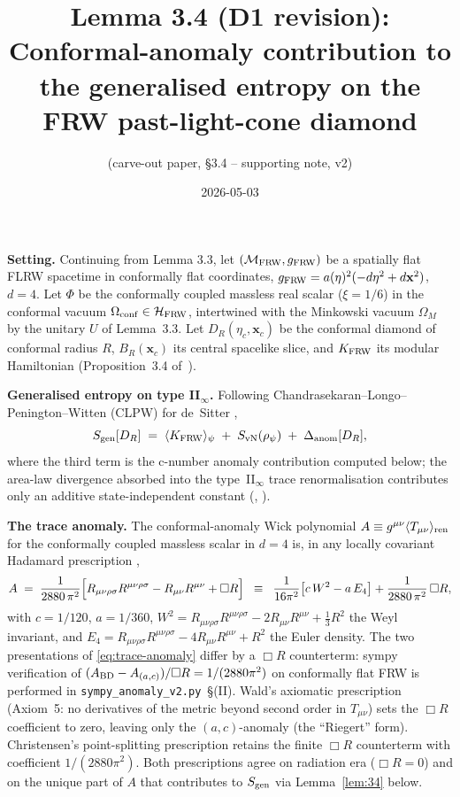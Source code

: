 \documentclass[11pt]{article}
\title{Lemma 3.4 (D1 revision):\\
       Conformal-anomaly contribution to the generalised entropy
       on the FRW past-light-cone diamond}
\author{(carve-out paper, \S 3.4 -- supporting note, v2)}
\date{2026-05-03}
\begin{document}
\maketitle

\noindent\textbf{Setting.}  Continuing from Lemma 3.3, let
$(\mathcal{M}_{\rm FRW},g_{\rm FRW})$ be a spatially flat FLRW spacetime
in conformally flat coordinates,
$g_{\rm FRW}=a(\eta)^2(-d\eta^2+d\mathbf{x}^2)$, $d=4$.  Let $\Phi$ be
the conformally coupled massless real scalar ($\xi=1/6$) in the
conformal vacuum $\Omega_{\rm conf}\in\mathcal{H}_{\rm FRW}$,
intertwined with the Minkowski vacuum $\Omega_M$ by the unitary $U$ of
Lemma~3.3.  Let $D_R(\eta_c,\mathbf{x}_c)$ be the conformal diamond of
conformal radius $R$, $B_R(\mathbf{x}_c)$ its central spacelike slice,
and $K_{\rm FRW}$ its modular Hamiltonian (Proposition~3.4
of~\cite{Lemma33}).

\medskip
\noindent\textbf{Generalised entropy on type II$_\infty$.}  Following
Chandrasekaran--Longo--Penington--Witten (CLPW) for de~Sitter
\cite{CLPW2022,Witten2021},
\begin{equation}
   S_{\rm gen}[D_R]
   \;=\;
   \langle K_{\rm FRW}\rangle_\psi \;+\; S_{\rm vN}(\rho_\psi)
   \;+\; \Delta_{\rm anom}[D_R],
   \label{eq:Sgen}
\end{equation}
where the third term is the c-number anomaly contribution computed
below; the area-law divergence absorbed into the type~II$_\infty$ trace
renormalisation contributes only an additive state-independent constant
(\cite[\S5.4]{CLPW2022}, \cite[\S2]{Witten2021}).

\medskip
\noindent\textbf{The trace anomaly.}  The conformal-anomaly Wick
polynomial $A\equiv g^{\mu\nu}\langle T_{\mu\nu}\rangle_{\rm ren}$ for
the conformally coupled massless scalar in $d=4$ is, in any locally
covariant Hadamard prescription \cite{HollandsWald2001,HollandsWald2014},
\begin{equation}
   A \;=\; \frac{1}{2880\,\pi^2}\Bigl[
        R_{\mu\nu\rho\sigma}R^{\mu\nu\rho\sigma}
        - R_{\mu\nu}R^{\mu\nu}
        + \Box R \Bigr]
   \;\;\equiv\;\;
   \frac{1}{16\pi^2}\bigl[c\,W^2-a\,E_4\bigr] +
        \frac{1}{2880\,\pi^2}\,\Box R,
   \label{eq:trace-anomaly}
\end{equation}
with $c=1/120$, $a=1/360$, $W^2=R_{\mu\nu\rho\sigma}R^{\mu\nu\rho\sigma}-2R_{\mu\nu}R^{\mu\nu}+\frac13R^2$
the Weyl invariant, and $E_4=R_{\mu\nu\rho\sigma}R^{\mu\nu\rho\sigma}-4R_{\mu\nu}R^{\mu\nu}+R^2$
the Euler density.  The two presentations of \eqref{eq:trace-anomaly}
differ by a $\Box R$ counterterm:
sympy verification of $({A_{\rm BD}}-{A_{(a,c)}})/\Box R=1/(2880\pi^2)$
on conformally flat FRW is performed in
\texttt{sympy\_anomaly\_v2.py}~\S(II).
Wald's axiomatic prescription \cite{Wald1978} (Axiom~5: no derivatives
of the metric beyond second order in $T_{\mu\nu}$) sets the $\Box R$
coefficient to zero, leaving only the $(a,c)$-anomaly (the
``Riegert'' form).  Christensen's point-splitting prescription
\cite{Christensen1976} retains the finite $\Box R$ counterterm with
coefficient $1/(2880\pi^2)$.  Both prescriptions agree on radiation
era ($\Box R=0$) and on the unique part of $A$ that contributes to
$S_{\rm gen}$ via Lemma~\ref{lem:34} below.
\end{document}
